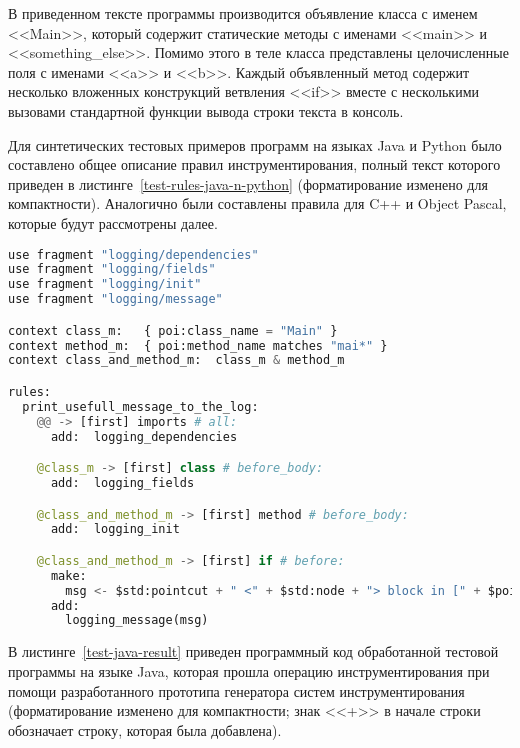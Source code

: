 В приведенном тексте программы производится объявление класса с именем <<Main>>, который содержит статические методы с именами <<main>> и <<something\_else>>.
Помимо этого в теле класса представлены целочисленные поля с именами <<a>> и <<b>>.
Каждый объявленный метод содержит несколько вложенных конструкций ветвления <<if>> вместе с несколькими вызовами стандартной функции вывода строки текста в консоль.

Для синтетических тестовых примеров программ на языках Java и Python было составлено общее описание правил инструментирования, полный текст которого приведен в листинге~\ref{test-rules-java-n-python} (форматирование изменено для компактности).
Аналогично были составлены правила для C++ и Object Pascal, которые будут рассмотрены далее.

\begin{lstlisting}[frame=single, language=Python, label={test-rules-java-n-python}, caption={Описание правил инструментирования.}]
use fragment "logging/dependencies"
use fragment "logging/fields"
use fragment "logging/init"
use fragment "logging/message"

context class_m:   { poi:class_name = "Main" }
context method_m:  { poi:method_name matches "mai*" }
context class_and_method_m:  class_m & method_m

rules:
  print_usefull_message_to_the_log:
    @@ -> [first] imports # all:
      add:  logging_dependencies

    @class_m -> [first] class # before_body:
      add:  logging_fields

    @class_and_method_m -> [first] method # before_body:
      add:  logging_init

    @class_and_method_m -> [first] if # before:
      make:
        msg <- $std:pointcut + " <" + $std:node + "> block in [" + $poi:class_name + "] class, in {" + $poi:method_name + "} method";
      add:
        logging_message(msg)
\end{lstlisting}

В листинге~\ref{test-java-result} приведен программный код обработанной тестовой программы на языке Java, которая прошла операцию инструментирования при помощи разработанного прототипа генератора систем инструментирования (форматирование изменено для компактности; знак <<+>> в начале строки обозначает строку, которая была добавлена).

